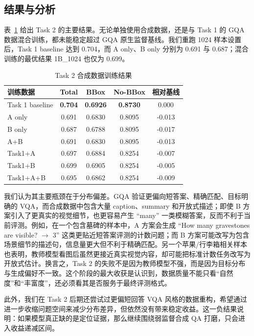 \documentclass[9pt,twocolumn,a4paper]{ctexart}
\begin{document}
\subsection{结果与分析}
表~\ref{tab:task2-main} 给出 Task 2 的主要结果。无论单独使用合成数据，还是与 Task 1 的 GQA 数据混合训练，都未能稳定超过 GQA 原生监督基线。我们重跑 1024 样本设置后，Task 1 baseline 达到 0.704，而 A only、B only 分别为 0.691 与 0.687；混合训练的最优结果 1B\_1024 也仅为 0.699。

\begin{table}[H]
\centering
\caption{Task 2 合成数据训练结果}
\label{tab:task2-main}
\scriptsize
\begin{tabular}{lcccc}
\toprule
训练数据 & Total & BBox & No-BBox & 相对基线 \\
\midrule
Task 1 baseline & \textbf{0.704} & \textbf{0.6926} & \textbf{0.8730} & 0.000 \\
A only & 0.691 & 0.6830 & 0.8095 & -0.013 \\
B only & 0.687 & 0.6788 & 0.8095 & -0.017 \\
A+B & 0.691 & 0.6830 & 0.8095 & -0.013 \\
Task1+A & 0.697 & 0.6884 & 0.8254 & -0.007 \\
Task1+B & 0.699 & 0.6905 & 0.8254 & -0.005 \\
Task1+A+B & 0.695 & 0.6862 & 0.8254 & -0.009 \\
\bottomrule
\end{tabular}
\end{table}

我们认为其主要瓶颈在于分布偏差。GQA 验证更偏向短答案、精确匹配、目标明确的 VQA，而合成数据中包含大量 caption、summary 和开放式描述；即使 B 方案引入了更真实的视觉细节，也更容易产生 ``many'' 一类模糊答案，反而不利于当前评测。例如，在一个包含墓碑的样本中，A 方案会生成 ``How many gravestones are visible? $\rightarrow$ 3'' 这类更贴近短答案评测的计数问题；而 B 方案可能改写为包含场景细节的描述句，信息量更大但不利于精确匹配。另一个苹果/行李箱相关样本也表明，教师模型看图后虽然更接近真实视觉内容，却可能把标准计数任务改写为开放式估计。换言之，Task 2 的失败不是因为教师模型不强，而是因为目标分布与生成偏好不一致。这个阶段的最大收获是认识到，数据质量不能只看“自然度”和“丰富度”，还必须看其是否服务于最终评测格式。

此外，我们在 Task 2 后期还尝试过更偏短回答 VQA 风格的数据重构，希望通过进一步收缩问题空间来减少分布差异，但依然没有带来稳定收益。这一负结果说明：如果模型真正缺的是定位证据，那么继续围绕弱监督合成 QA 打磨，只会进入收益递减区间。
\end{document}
